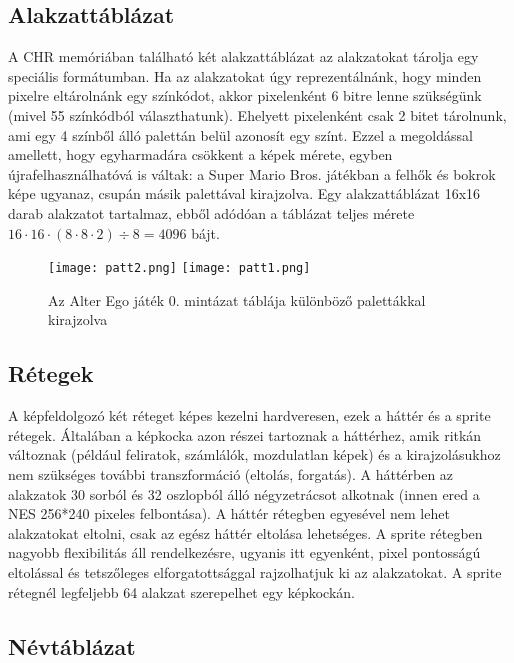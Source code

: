 \subsection{Alakzattáblázat}

A CHR memóriában található két alakzattáblázat az alakzatokat tárolja egy speciális formátumban. Ha az alakzatokat úgy reprezentálnánk, hogy minden pixelre eltárolnánk egy színkódot, akkor pixelenként 6 bitre lenne szükségünk (mivel 55 színkódból választhatunk). Ehelyett pixelenként csak 2 bitet tárolnunk, ami egy 4 színből álló palettán belül azonosít egy színt. Ezzel a megoldással amellett, hogy egyharmadára csökkent a képek mérete, egyben újrafelhasználhatóvá is váltak: a Super Mario Bros. játékban a felhők és bokrok képe ugyanaz, csupán másik palettával kirajzolva.
Egy alakzattáblázat 16x16 darab alakzatot tartalmaz, ebből adódóan a táblázat teljes mérete $16\cdot16\cdot(8\cdot8\cdot2)\div8 = 4096$ bájt.

\begin{figure}[H]
	\centering
	\texttt{[image: patt2.png]}
	\hspace{5pt}
	\texttt{[image: patt1.png]}
	\caption{Az Alter Ego játék 0. mintázat táblája különböző palettákkal kirajzolva}
\end{figure}

\subsection{Rétegek}
A képfeldolgozó két réteget képes kezelni hardveresen, ezek a háttér és a sprite rétegek.
Általában a képkocka azon részei tartoznak a háttérhez, amik ritkán változnak (például feliratok, számlálók, mozdulatlan képek) és a kirajzolásukhoz nem szükséges további transzformáció (eltolás, forgatás). A háttérben az alakzatok 30 sorból és 32 oszlopból álló négyzetrácsot alkotnak (innen ered a NES 256*240 pixeles felbontása).
A háttér rétegben egyesével nem lehet alakzatokat eltolni, csak az egész háttér eltolása lehetséges. A sprite rétegben nagyobb flexibilitás áll rendelkezésre, ugyanis itt egyenként, pixel pontosságú eltolással és tetszőleges elforgatottsággal rajzolhatjuk ki az alakzatokat. A sprite rétegnél legfeljebb 64 alakzat szerepelhet egy képkockán.  

\subsection{Névtáblázat}

